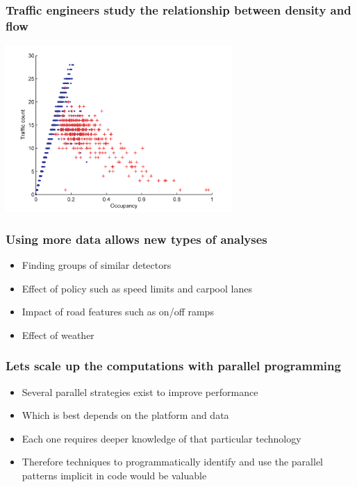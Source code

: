 \documentclass{beamer}
\begin{document}
\begin{frame}

    \frametitle{Traffic engineers study the relationship between 
    density and flow \cite{li2011fundamental}}

\centerline{\includegraphics[height=2.5in]{fundamental_diagram.png}}

\end{frame}
\begin{frame}

    \frametitle{Using more data allows new types of analyses}

    \begin{itemize}
        \item Finding groups of similar detectors
        \item Effect of policy such as speed limits and carpool lanes
        \item Impact of road features such as on/off ramps
        \item Effect of weather
    \end{itemize}

\end{frame}
\begin{frame}

    \frametitle{Lets scale up the computations with parallel programming}

    \begin{itemize}
        \item Several parallel strategies exist to improve performance
        \item Which is best depends on the platform and data
        \item Each one requires deeper knowledge of that particular technology
        \item Therefore techniques to programmatically identify and use the parallel
  patterns implicit in code would be valuable
    \end{itemize}

\end{frame}
\end{document}
